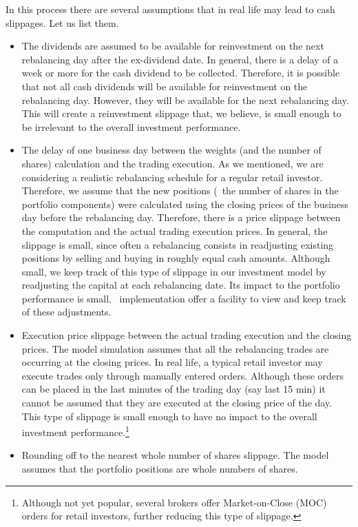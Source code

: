 In this process there are several assumptions that in real life may lead to cash slippages. Let us list them.
\begin{itemize}
  \item The dividends are assumed to be available for reinvestment on the next rebalancing day after the ex-dividend date.
  In general, there is a delay of a week or more for the cash dividend to be collected. Therefore, it is possible that not all 
  cash dividends will be available for reinvestment on the rebalancing day. However, they will be available for the
  next rebalancing day. This will create a reinvestment slippage that, we believe, is small enough to be
  irrelevant to the overall investment performance.
  \item The delay of one business day between the weights (and the number of shares) calculation and the trading execution. As we mentioned, we
  are considering a realistic rebalancing schedule for a regular retail investor. Therefore, we assume that the new positions
  (\ie\ the number of shares in the portfolio components) were calculated using the closing prices of the business day before the rebalancing day.
  Therefore, there is a price slippage between the computation and the actual trading execution prices.
  In general, the slippage is small, since often a rebalancing consists in readjusting existing positions by selling and buying
  in roughly equal cash amounts. Although small, we keep track of this type of slippage in our investment model by
  readjusting the capital at each rebalancing date. Its impact to the portfolio performance is small. \azapy\ implementation
  offer a facility to view and keep track of these adjustments.
  \item Execution price slippage between the actual trading execution and the closing prices. The model simulation assumes that all
  the rebalancing trades are occurring at the closing prices. In real life, a typical retail investor may execute trades only through manually entered orders.
  Although these orders can be placed in the last minutes of the trading day (say last 15 min) it cannot be assumed that they are executed
  at the closing price of the day. This type of slippage is small enough to have no impact to the overall investment
  performance.\footnote{Although not yet popular, several brokers offer Market-on-Close (MOC) orders for retail investors,
  further reducing this type of  slippage.}
  \item Rounding off to the nearest whole number of shares slippage. The model assumes that the portfolio positions are whole numbers of shares.

\end{itemize}
